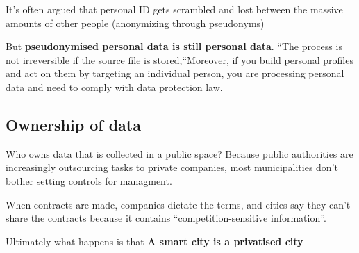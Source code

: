 It's often argued that personal ID gets scrambled and lost between the massive amounts of other people (anonymizing through pseudonyms)

But \textbf{pseudonymised personal data is still personal data}. “The process is not irreversible if the source file is stored,“Moreover, if you build personal profiles and act on them by targeting an individual person, you are processing personal data and need to comply with data protection law. 

\subsection{Ownership of data} 

Who owns data that is collected in a public space? Because public authorities are increasingly outsourcing tasks to private companies, most municipalities don't bother setting controls for managment.

When contracts are made, companies dictate the terms, and cities say they can’t share the contracts because it contains “competition-sensitive information”.

Ultimately what happens is that \textbf{A smart city is a privatised city}


